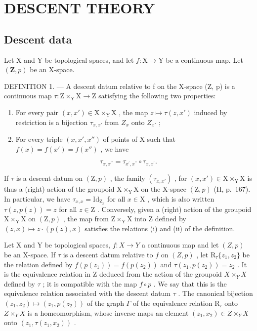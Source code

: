 \section{DESCENT THEORY}

\subsection{Descent data}

Let X and Y be topological spaces, and let \(f \colon \mathrm{X} \to \mathrm{Y}\) be a continuous map. Let \((\mathbf{Z}, p)\) be an X-space.

DEFINITION 1. --- A descent datum relative to f on the X-space (Z, p) is a continuous map \(\tau\colon \mathrm{Z}\times_{\mathrm{Y}}\mathrm{X}\to\mathrm{Z}\) satisfying the following two properties:

\begin{enumerate}
\def\labelenumi{(\roman{enumi})}
\item
  For every pair \((x, x') \in \mathrm{X} \times_{\mathrm{Y}} \mathrm{X}\) , the map \(z \mapsto \tau(z, x')\) induced by restriction is a bijection \(\tau_{x,x'}\) from \(Z_x\) onto \(Z_{x'}\) ;
\item
  For every triple \((x,x',x'')\) of points of X such that \(f(x)=f(x')=f(x'')\) , we have
\end{enumerate}

\[
\tau_ {x, x ^ {\prime \prime}} = \tau_ {x ^ {\prime}, x ^ {\prime \prime}} \circ \tau_ {x, x ^ {\prime}}.
\]

If \(\tau\) is a descent datum on \((\mathrm{Z},p)\) , the family \((\tau_{x,x'})\) , for \((x,x')\in \mathrm{X}\times_{\mathrm{Y}}\mathrm{X}\) is thus a (right) action of the groupoid \(\mathrm{X}\times_{\mathrm{Y}}\mathrm{X}\) on the X-space \((\mathrm{Z},p)\) (II, p.~167). In particular, we have \(\tau_{x,x} = \mathrm{Id}_{\mathrm{Z}_x}\) for all \(x\in \mathrm{X}\) , which is also written \(\tau (z,p(z)) = z\) for all \(z\in \mathrm{Z}\) . Conversely, given a (right) action of the groupoid \(\mathrm{X}\times_{\mathrm{Y}}\mathrm{X}\) on \((\mathrm{Z},p)\) , the map from \(\mathrm{Z}\times_{\mathrm{Y}}\mathrm{X}\) into Z defined by \((z,x)\mapsto z\cdot (p(z),x)\) satisfies the relations (i) and (ii) of the definition.

Let X and Y be topological spaces, \(f\colon X\to Y\) a continuous map and let \((Z,p)\) be an X-space. If \(\tau\) is a descent datum relative to \(f\) on \((Z,p)\) , let \(\mathrm{R}_{\tau}\{z_{1},z_{2}\}\) be the relation defined by \(f(p(z_{1})) = f(p(z_{2}))\) and \(\tau (z_1,p(z_2)) = z_2\) . It is the equivalence relation in Z deduced from the action of the groupoid \(X\times_Y X\) defined by \(\tau\) ; it is compatible with the map \(f\circ p\) . We say that this is the equivalence relation associated with the descent datum \(\tau\) . The canonical bijection \((z_{1},z_{2})\mapsto (z_{1},p(z_{2}))\) of the graph \(\Gamma\) of the equivalence relation \(\mathrm{R}_{\tau}\) onto \(Z\times_Y X\) is a homeomorphism, whose inverse maps an element \((z_{1},x_{2})\in Z\times_Y X\) onto \((z_{1},\tau (z_{1},x_{2}))\) .

